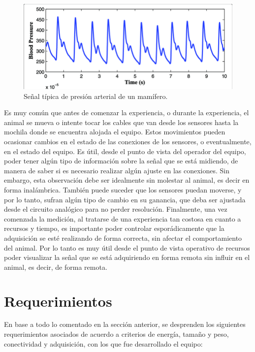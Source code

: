 \begin{figure}[!htbp]
	\centering
	\includegraphics[width=\textwidth]{./Figures/senpresion.png}
	\caption{Señal típica de presión arterial de un mamífero.}
	\label{fig:senpresion}
\end{figure}

Es muy común que antes de comenzar la experiencia, o durante la experiencia, el animal se mueva o intente tocar los cables que van desde los sensores hasta la mochila donde se encuentra alojada el equipo. Estos movimientos pueden ocasionar cambios en el estado de las conexiones de los sensores, o eventualmente, en el estado del equipo. Es útil, desde el punto de vista del operador del equipo, poder tener algún tipo de información sobre la señal que se está midiendo, de manera de saber si es necesario realizar algún ajuste en las conexiones. Sin embargo, esta observación debe ser idealmente sin molestar al animal, es decir en forma inalámbrica. También puede suceder que los sensores puedan moverse, y por lo tanto, sufran algún tipo de cambio en su ganancia, que deba ser ajustada desde el circuito analógico para no perder resolución. 
Finalmente, una vez comenzada la medición, al tratarse de una experiencia tan costosa en cuanto a recursos y tiempo, es importante poder controlar esporádicamente que la adquisición se esté realizando de forma correcta, sin afectar el comportamiento del animal. Por lo tanto es muy útil desde el punto de vista operativo de recursos poder visualizar la señal que se está adquiriendo en forma remota sin influir en el animal, es decir, de forma remota.


\section{Requerimientos}

En base a todo lo comentado en la sección anterior, se desprenden los siguientes requerimientos asociados de acuerdo a criterios de energía, tamaño y peso, conectividad y adquisición, con los que fue desarrollado el equipo:


